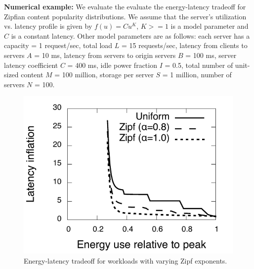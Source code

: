 \textbf{Numerical example:} We evaluate the evaluate the energy-latency tradeoff for Zipfian content popularity distributions. We assume that the server's utilization vs. latency profile is given by $f(u) = Cu^K$, $K>=1$ is a model parameter and $C$ is a constant latency. Other model parameters are as follows: each server has a capacity = 1 request/sec, total load $L$ = 15 requests/sec, latency from clients to servers $A$ = 10 ms, latency from servers to origin servers $B$ = 100 ms, server latency coefficient $C$ = 400 ms, idle power fraction $I$ = 0.5, total number of unit-sized content $M$ = 100 million, storage per server $S$ = 1 million, number of servers $N$ = 100. 

\begin{figure}[t]
\centering
    \includegraphics[scale=0.4]{graphs/vary-z.pdf}

  \caption{Energy-latency tradeoff for workloads with varying Zipf exponents.}
    \label{fig:vary-z}
\end{figure}


